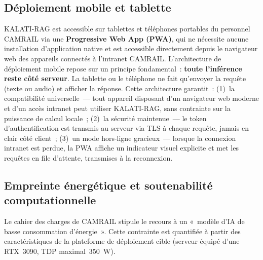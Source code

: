 \documentclass[12pt,a4paper]{report}
\begin{document}
\subsection{Déploiement mobile et tablette}

KALATI-RAG est accessible sur tablettes et téléphones portables du personnel CAMRAIL via une
\textbf{Progressive Web App (PWA)}, qui ne nécessite aucune installation d'application native et
est accessible directement depuis le navigateur web des appareils connectés à l'intranet CAMRAIL.
L'architecture de déploiement mobile repose sur un principe fondamental~: \textbf{toute
l'inférence reste côté serveur}. La tablette ou le téléphone ne fait qu'envoyer la requête
(texte ou audio) et afficher la réponse. Cette architecture garantit~: (1)~la compatibilité
universelle~--- tout appareil disposant d'un navigateur web moderne et d'un accès intranet
peut utiliser KALATI-RAG, sans contrainte sur la puissance de calcul locale~; (2)~la sécurité
maintenue~--- le token d'authentification est transmis au serveur via TLS à chaque requête,
jamais en clair côté client~; (3)~un mode hors-ligne gracieux~--- lorsque la connexion intranet
est perdue, la PWA affiche un indicateur visuel explicite et met les requêtes en file d'attente,
transmises à la reconnexion.

\subsection{Empreinte énergétique et soutenabilité computationnelle}

Le cahier des charges de CAMRAIL stipule le recours à un «~modèle d'IA de basse consommation
d'énergie~». Cette contrainte est quantifiée à partir des caractéristiques de la plateforme de
déploiement cible (serveur équipé d'une RTX~3090, TDP maximal~350~W).
\end{document}
